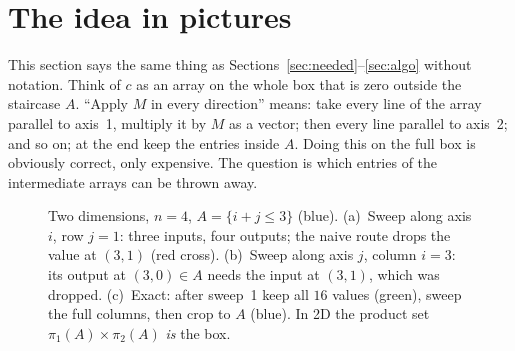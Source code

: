 \documentclass[11pt]{article}
\newcommand{\pr}[1]{\pi_{#1}}
\begin{document}
\section{The idea in pictures}\label{sec:pict}
This section says the same thing as Sections~\ref{sec:needed}--\ref{sec:algo} without notation. Think of $c$ as an
array on the whole box that is zero outside the staircase $A$. ``Apply $M$ in every direction'' means: take every line
of the array parallel to axis~1, multiply it by $M$ as a vector; then every line parallel to axis~2; and so on; at the
end keep the entries inside $A$. Doing this on the full box is obviously correct, only expensive. The question is
which entries of the intermediate arrays can be thrown away.

\begin{figure}[ht]\centering
{}
\caption{Two dimensions, $n=4$, $A=\{i+j\le3\}$ (blue). (a)~Sweep along axis $i$, row $j=1$: three inputs, four
outputs; the naive route drops the value at $(3,1)$ (red cross). (b)~Sweep along axis $j$, column $i=3$: its output at
$(3,0)\in A$ needs the input at $(3,1)$, which was dropped. (c)~Exact: after sweep~1 keep all $16$ values (green), sweep
the full columns, then crop to $A$ (blue). In 2D the product set $\pr{1}(A)\times\pr{2}(A)$ \emph{is} the box.}\label{fig:2d}
\end{figure}
\end{document}
